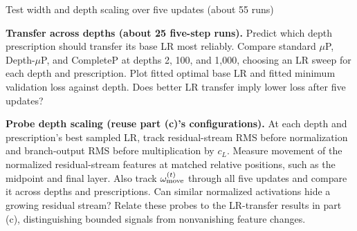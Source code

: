 \begin{problem}{Test width and depth scaling over five updates (about 55 runs)}
\begin{parts}
\item \textbf{Transfer across depths (about 25 five-step runs).}
Predict which depth prescription should transfer its base LR most reliably.
Compare standard $\mu$P, Depth-$\mu$P, and CompleteP at depths 2, 100, and
1,000, choosing an LR sweep for each depth and prescription.
Plot fitted optimal base LR and fitted minimum validation loss against depth.
Does better LR transfer imply lower loss after five updates?

\item \textbf{Probe depth scaling (reuse part (c)'s configurations).}
At each depth and prescription's best sampled LR, track residual-stream RMS
before normalization and branch-output RMS before multiplication by $c_L$.
Measure movement of the normalized residual-stream features at matched
relative positions, such as the midpoint and final layer.
Also track $\omega_{\rm move}^{(t)}$ through
all five updates and compare it across depths and prescriptions.
Can similar normalized activations hide a growing residual stream?
Relate these probes to the LR-transfer results in part (c), distinguishing
bounded signals from nonvanishing feature changes.
\end{parts}
\end{problem}
